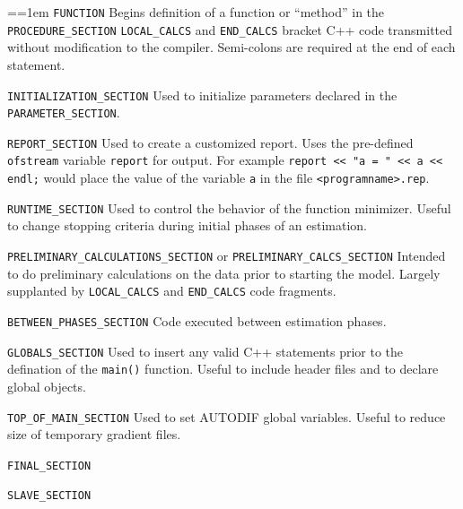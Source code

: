 \par{\everypar={\hangindent=1em }
\verb+FUNCTION+ Begins definition of a function or ``method'' in the \verb+PROCEDURE_SECTION+ 
\verb+LOCAL_CALCS+ and \verb+END_CALCS+ bracket C++ code transmitted
without modification to the compiler. 
Semi-colons are required at the end of each statement.

\verb+INITIALIZATION_SECTION+
Used to initialize parameters declared in the \verb+PARAMETER_SECTION+. 

\verb+REPORT_SECTION+
Used to create a customized report. Uses the pre-defined
\verb+ofstream+ variable \verb+report+ for output. For example
\verb+report << "a = " << a << endl;+ would place the value of the
variable \verb+a+ in the file \verb+<programname>.rep+.

\verb+RUNTIME_SECTION+
Used to control the behavior of the function minimizer. Useful to
change stopping criteria during initial phases of an estimation.

\verb+PRELIMINARY_CALCULATIONS_SECTION+ or \verb+PRELIMINARY_CALCS_SECTION+
Intended to do preliminary calculations on the data prior to starting
the model. Largely supplanted by 
\verb+LOCAL_CALCS+ and \verb+END_CALCS+ code fragments.

\verb+BETWEEN_PHASES_SECTION+
Code executed between estimation phases.

\verb+GLOBALS_SECTION+
Used to insert any valid C++ statements prior to the defination of
the \verb+main()+ function. Useful to include header files and to
declare global objects.

\verb+TOP_OF_MAIN_SECTION+
Used to set AUTODIF global variables. Useful to reduce size of
temporary gradient files.

\verb+FINAL_SECTION+

\verb+SLAVE_SECTION+

}

